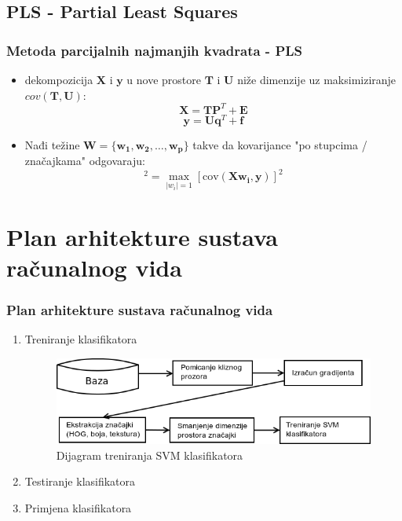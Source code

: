 \documentclass{beamer}
\begin{document}
\subsection{PLS - Partial Least Squares}
\begin{frame}
\frametitle{Metoda parcijalnih najmanjih kvadrata - PLS}
\begin{itemize}
\item{dekompozicija $\mathbf{X}$ i $\mathbf{y}$ u nove prostore $\mathbf{T}$ i $\mathbf{U}$ niže dimenzije uz maksimiziranje $cov(\mathbf{T}, \mathbf{U})$:
\begin{equation*}
\mathbf{X} = \mathbf{T} \mathbf{P}^T + \mathbf{E} 
\end{equation*}
\begin{equation*}
\mathbf{y} = \mathbf{U} \mathbf{q}^T + \mathbf{f} 
\end{equation*}
}

\item{Nađi težine $\mathbf{W} = \{\mathbf{w_1}, \mathbf{w_2}, \dots,
\mathbf{w_p} \}$ takve da kovarijance "po stupcima / značajkama" odgovaraju:
\begin{equation*}
[\mathrm{cov}(\mathbf{t_i}, \mathbf{u_i})]^ 2 = \max_{|w_i| = 1} [\mathrm{cov}(\mathbf{X}\mathbf{w_i} ,\mathbf{y})]^ 2
\end{equation*}}
\end{itemize}

\end{frame}

\section{Plan arhitekture sustava računalnog vida}
\begin{frame}
\frametitle{Plan arhitekture sustava računalnog vida}
\begin{enumerate}
\item Treniranje klasifikatora
\begin{figure}[h!]
\center
\includegraphics[scale=0.5]{img/treniranje.png}
\caption{Dijagram treniranja SVM klasifikatora}
\label{treniranje}
\end{figure}
\item Testiranje klasifikatora
\item Primjena klasifikatora
\end{enumerate}
\end{frame}
\end{document}
